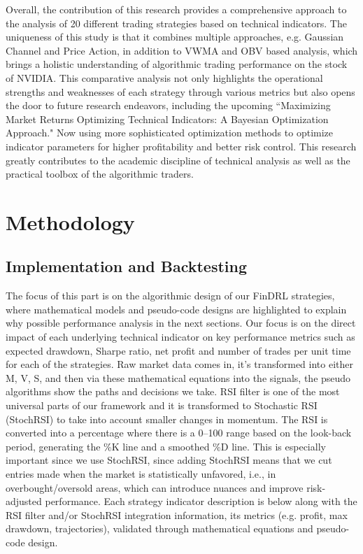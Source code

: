 Overall, the contribution of this research provides a comprehensive approach to the analysis of 20 different trading strategies based on technical indicators. The uniqueness of this study is that it combines multiple approaches, e.g. Gaussian Channel and Price Action, in addition to VWMA and OBV based analysis, which brings a holistic understanding of algorithmic trading performance on the stock of NVIDIA. This comparative analysis not only highlights the operational strengths and weaknesses of each strategy through various metrics but also opens the door to future research endeavors, including the upcoming “Maximizing Market Returns Optimizing Technical Indicators: A Bayesian Optimization Approach." Now using more sophisticated optimization methods to optimize indicator parameters for higher profitability and better risk control. This research greatly contributes to the academic discipline of technical analysis as well as the practical toolbox of the algorithmic traders.


\section{Methodology}
\subsection{Implementation and Backtesting}
The focus of this part is on the algorithmic design of our FinDRL strategies, where mathematical models and pseudo-code designs are highlighted to explain why possible performance analysis in the next sections. Our focus is on the direct impact of each underlying technical indicator on key performance metrics such as expected drawdown, Sharpe ratio, net profit and number of trades per unit time for each of the strategies. Raw market data comes in, it’s transformed into either M, V, S, and then via these mathematical equations into the signals, the pseudo algorithms show the paths and decisions we take.
RSI filter is one of the most universal parts of our framework and it is transformed to Stochastic RSI (StochRSI) to take into account smaller changes in momentum. The RSI is converted into a percentage where there is a 0–100 range based on the look-back period, generating the \%K line and a smoothed \%D line. This is especially important since we use StochRSI, since adding StochRSI means that we cut entries made when the market is statistically unfavored, i.e., in overbought/oversold areas, which can introduce nuances and improve risk-adjusted performance. Each strategy indicator description is below along with the RSI filter and/or StochRSI integration information, its metrics (e.g. profit, max drawdown, trajectories), validated through mathematical equations and pseudo-code design.


